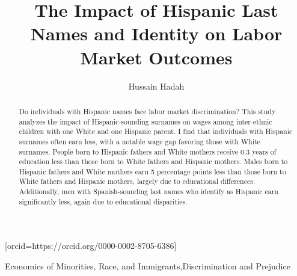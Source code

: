 \documentclass[a4paper,fleqn]{cas-sc}
\begin{document}
\let\WriteBookmarks\relax
\def\floatpagepagefraction{1}
\def\textpagefraction{.001}



\title [mode = title]{The Impact of Hispanic Last Names and Identity on Labor Market Outcomes}

\author[]{Hussain Hadah}[orcid=https://orcid.org/0000-0002-8705-6386]





\begin{abstract}
\singlespacing %
Do individuals with Hispanic names face labor market discrimination? This study analyzes the impact of Hispanic-sounding surnames on wages among inter-ethnic children with one White and one Hispanic parent. I find that individuals with Hispanic surnames often earn less, with a notable wage gap favoring those with White surnames. People born to Hispanic fathers and White mothers receive 0.3 years of education less than those born to White fathers and Hispanic mothers. Males born to Hispanic fathers and White mothers earn 5 percentage points less than those born to White fathers and Hispanic mothers, largely due to educational differences. Additionally, men with Spanish-sounding last names who identify as Hispanic earn significantly less, again due to educational disparities.
\end{abstract}

\begin{keywords}
\singlespacing %

 Economics of Minorities, Race, and Immigrants\sep Discrimination and Prejudice\\
\end{keywords}


\maketitle
\end{document}
